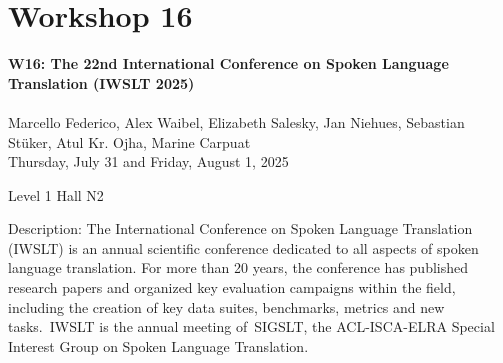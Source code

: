 \clearpage



\section[W16: The 22nd International Conference on Spoken Language Translation (IWSLT 2025)]{Workshop 16}
\label{workshop_16_1}
\label{workshop_16_2}

\begin{center}
    {\Large \textbf{W16: The 22nd International Conference on Spoken Language Translation (IWSLT 2025)}}\\
    \\


   Marcello Federico, Alex Waibel, Elizabeth Salesky, Jan Niehues, Sebastian Stüker, Atul Kr. Ojha, Marine Carpuat\\
    
    Thursday, July 31 and Friday, August 1, 2025
    
    Level 1 Hall N2

\end{center}

Description: The International Conference on Spoken Language Translation (IWSLT) is an annual scientific conference dedicated to all aspects of spoken language translation. For more than 20 years, the conference has published research papers and organized key evaluation campaigns within the field, including the creation of key data suites, benchmarks, metrics and new tasks. IWSLT is the annual meeting of SIGSLT, the ACL-ISCA-ELRA Special Interest Group on Spoken Language Translation.

